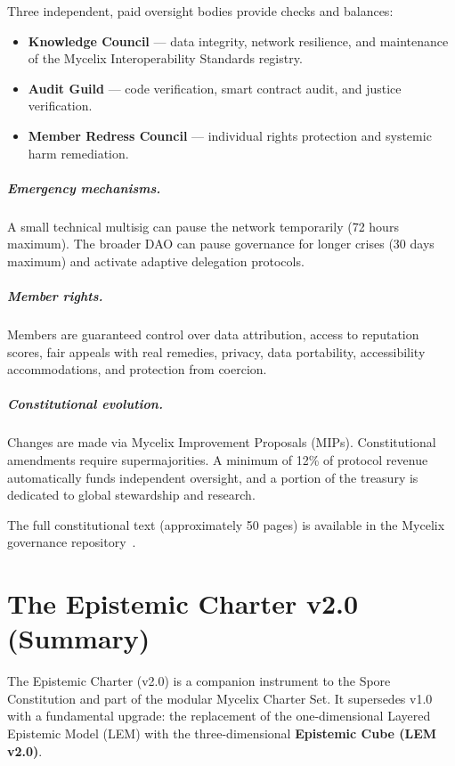 \documentclass[12pt]{book}
\begin{document}
Three independent, paid oversight bodies provide checks and balances:
\begin{itemize}
  \item \textbf{Knowledge Council} --- data integrity, network resilience, and
    maintenance of the Mycelix Interoperability Standards registry.
  \item \textbf{Audit Guild} --- code verification, smart contract audit, and
    justice verification.
  \item \textbf{Member Redress Council} --- individual rights protection and
    systemic harm remediation.
\end{itemize}

\paragraph{Emergency mechanisms.}
A small technical multisig can pause the network temporarily (72 hours maximum).
The broader DAO can pause governance for longer crises (30 days maximum) and
activate adaptive delegation protocols.

\paragraph{Member rights.}
Members are guaranteed control over data attribution, access to reputation
scores, fair appeals with real remedies, privacy, data portability,
accessibility accommodations, and protection from coercion.

\paragraph{Constitutional evolution.}
Changes are made via Mycelix Improvement Proposals (MIPs). Constitutional
amendments require supermajorities. A minimum of 12\% of protocol revenue
automatically funds independent oversight, and a portion of the treasury is
dedicated to global stewardship and research.

The full constitutional text (approximately 50 pages) is available in the
Mycelix governance repository~\cite{sporeconstitution}.


\chapter{The Epistemic Charter v2.0 (Summary)}
\label{app:epistemic}

The Epistemic Charter (v2.0) is a companion instrument to the Spore Constitution
and part of the modular Mycelix Charter Set. It supersedes v1.0 with a
fundamental upgrade: the replacement of the one-dimensional Layered Epistemic
Model (LEM) with the three-dimensional \textbf{Epistemic Cube (LEM v2.0)}.
\end{document}
